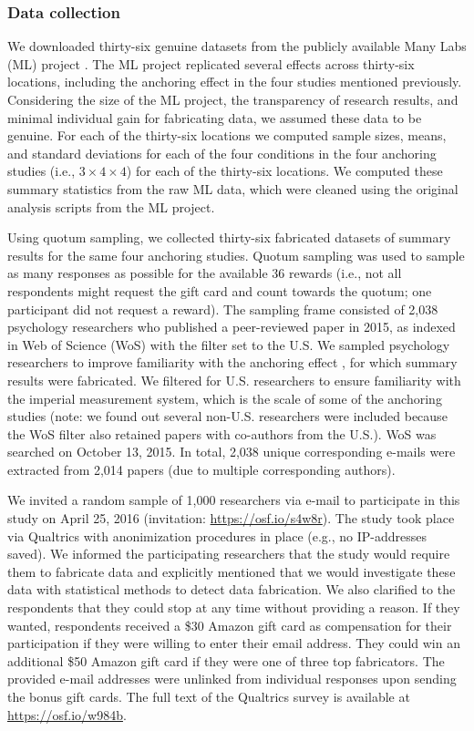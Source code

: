 \documentclass{article}
\begin{document}
\subsubsection*{Data collection}

We downloaded thirty-six genuine datasets from the publicly available Many Labs (ML) project \citep[\url{https://osf.io/pqf9r};][]{klein2014}. The ML project replicated several effects across thirty-six locations, including the anchoring effect in the four studies mentioned previously. Considering the size of the ML project, the transparency of research results, and minimal individual gain for fabricating data, we assumed these data to be genuine. For each of the thirty-six locations we computed sample sizes, means, and standard deviations for each of the four conditions in the four anchoring studies (i.e., $3\times4\times4$) for each of the thirty-six locations. We computed these summary statistics from the raw ML data, which were cleaned using the original analysis scripts from the ML project.

Using quotum sampling, we collected thirty-six fabricated datasets of summary results for the same four anchoring studies. Quotum sampling was used to sample as many responses as possible for the available 36 rewards (i.e., not all respondents might request the gift card and count towards the quotum; one participant did not request a reward). The sampling frame consisted of 2,038 psychology researchers who published a peer-reviewed paper in 2015, as indexed in Web of Science (WoS) with the filter set to the U.S. We sampled psychology researchers to improve familiarity with the anchoring effect \citep{jacowitz1995,tversky1974}, for which summary results were fabricated. We filtered for U.S. researchers to ensure familiarity with the imperial measurement system, which is the scale of some of the anchoring studies (note: we found out several non-U.S. researchers were included because the WoS filter also retained papers with co-authors from the U.S.). WoS was searched on October 13, 2015. In total, 2,038 unique corresponding e-mails were extracted from 2,014 papers (due to multiple corresponding authors).

We invited a random sample of 1,000 researchers via e-mail to participate in this study on April 25, 2016 (invitation: \url{https://osf.io/s4w8r}). The study took place via Qualtrics with anonimization procedures in place (e.g., no IP-addresses saved). We informed the participating researchers that the study would require them to fabricate data and explicitly mentioned that we would investigate these data with statistical methods to detect data fabrication. We also clarified to the  respondents that they could stop at any time without providing a reason. If they wanted, respondents received a \$30 Amazon gift card as compensation for their participation if they were willing to enter their email address. They could win an additional \$50 Amazon gift card if they were one of three top fabricators. The provided e-mail addresses were unlinked from individual responses upon sending the bonus gift cards. The full text of the Qualtrics survey is available at \url{https://osf.io/w984b}.
\end{document}
